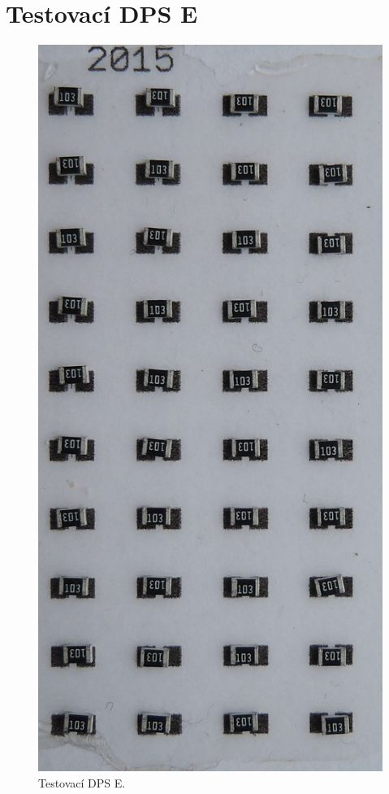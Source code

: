 \section{Testovací DPS E}
\begin{figure}[H]
  \centering
    \includegraphics[height=0.35\paperheight ]{obrazky/E2.jpg}%
    \caption{Testovací DPS E.}
    \label{img:DeskaE}
\end{figure}



